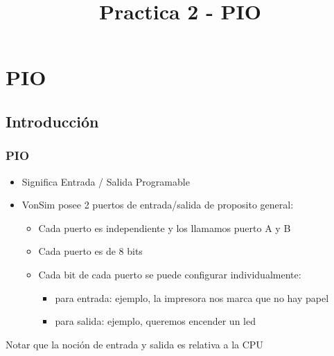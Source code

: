 \documentclass{beamer}
\title{Practica 2 - PIO}
\begin{document}
\begin{frame}
\titlepage
\end{frame}

\section{PIO}
\subsection{Introducción}
\begin{frame}
\frametitle{PIO}
\begin{itemize}
 \item Significa Entrada / Salida Programable
 \item VonSim posee 2 puertos de entrada/salida de proposito general:
 \begin{itemize}
   \item Cada puerto es independiente y los llamamos puerto A y B
   \item Cada puerto es de 8 bits 
   \item Cada bit de cada puerto se puede configurar individualmente:
   \begin{itemize}
     \item para entrada: ejemplo, la impresora nos marca que no hay papel
     \item para salida: ejemplo, queremos encender un led
   \end{itemize}
 \end{itemize}
\end{itemize}
\begin{block}{}
Notar que la noción de entrada y salida es relativa a la CPU
\end{block}
\end{frame}
\end{document}
